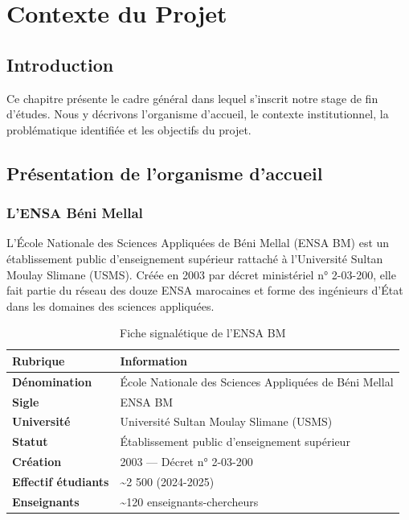\chapter{Contexte du Projet}
\label{chapitre-1-contexte-du-projet}

\section{Introduction}
\label{introduction}

Ce chapitre présente le cadre général dans lequel s'inscrit notre stage de fin d'études. Nous y décrivons l'organisme d'accueil, le contexte institutionnel, la problématique identifiée et les objectifs du projet.

\section{Présentation de l'organisme d'accueil}
\label{presentation-de-lorganisme-daccueil}

\subsection{L'ENSA Béni Mellal}
\label{lensa-beni-mellal}

L'École Nationale des Sciences Appliquées de Béni Mellal (ENSA BM) est un établissement public d'enseignement supérieur rattaché à l'Université Sultan Moulay Slimane (USMS). Créée en 2003 par décret ministériel n° 2-03-200, elle fait partie du réseau des douze ENSA marocaines et forme des ingénieurs d'État dans les domaines des sciences appliquées.

\begin{table}[htbp]
  \centering
  \caption{Fiche signalétique de l'ENSA BM}
  \begin{tabularx}{\textwidth}{@{} >{\bfseries}l X @{}}
    \toprule
    \textbf{Rubrique} & \textbf{Information} \\
    \midrule
    Dénomination & École Nationale des Sciences Appliquées de Béni Mellal \\
    Sigle & ENSA BM \\
    Université & Université Sultan Moulay Slimane (USMS) \\
    Statut & Établissement public d'enseignement supérieur \\
    Création & 2003 --- Décret n° 2-03-200 \\
    Effectif étudiants & \textasciitilde2 500 (2024-2025) \\
    Enseignants & \textasciitilde120 enseignants-chercheurs \\
    \bottomrule
  \end{tabularx}
  \label{tab:fiche-ensa}
\end{table}

